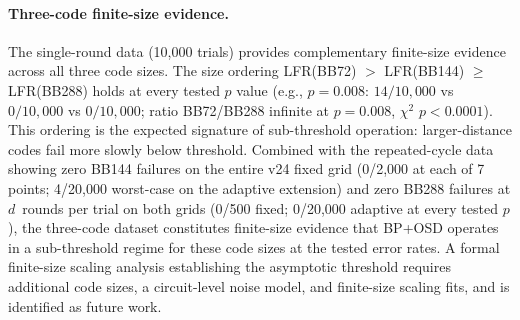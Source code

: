 \documentclass[11pt,a4paper]{article}
\begin{document}
\paragraph{Three-code finite-size evidence.}
The single-round data (10{,}000 trials) provides complementary
finite-size evidence across all three code sizes.
The size ordering LFR(BB72) $>$ LFR(BB144) $\ge$ LFR(BB288) holds
at every tested $p$ value
(e.g., $p=0.008$: $14/10{,}000$ vs $0/10{,}000$ vs $0/10{,}000$;
ratio BB72/BB288 infinite at $p=0.008$, $\chi^2$ $p<0.0001$).
This ordering is the expected signature of sub-threshold operation:
larger-distance codes fail more slowly below threshold.
Combined with the repeated-cycle data showing zero BB144 failures
on the entire v24 fixed grid (0/2{,}000 at each of 7 points;
4/20{,}000 worst-case on the adaptive extension) and zero BB288
failures at $d$~rounds per trial on both grids (0/500 fixed;
0/20{,}000 adaptive at every tested $p$), the three-code dataset
constitutes finite-size evidence that BP+OSD operates in a sub-threshold
regime for these code sizes at the tested error rates.
A formal finite-size scaling analysis establishing the asymptotic threshold
requires additional code sizes, a circuit-level noise model, and
finite-size scaling fits, and is identified as future work.
\end{document}
